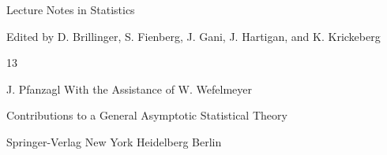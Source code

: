  \begin{center} Lecture Notes in Statistics \end{center}  Edited by D. Brillinger, S. Fienberg, J. Gani, J. Hartigan, and K. Krickeberg  \vspace{1cm}  \begin{center} 13 \end{center}  \vspace{1cm}  \begin{center} J. Pfanzagl  With the Assistance of W. Wefelmeyer \end{center}  \vspace{1cm}  \begin{center} Contributions to a General Asymptotic Statistical Theory \end{center}  \vspace{1cm}  \begin{center} Springer-Verlag New York Heidelberg Berlin \end{center} 